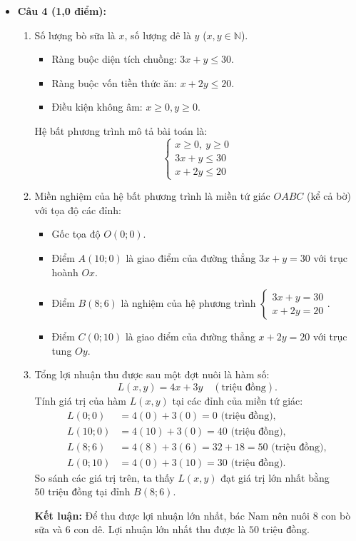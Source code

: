 \documentclass[12pt,a4paper]{article}
\begin{document}
\begin{itemize}[leftmargin=0.6cm, itemsep=4pt]
\item \textbf{Câu 4 (1,0 điểm):}
\begin{enumerate}
    \item Số lượng bò sữa là $x$, số lượng dê là $y$ ($x, y \in \mathbb{N}$).
    \begin{itemize}
        \item Ràng buộc diện tích chuồng: $3x + y \leq 30$.
        \item Ràng buộc vốn tiền thức ăn: $x + 2y \leq 20$.
        \item Điều kiện không âm: $x \geq 0, y \geq 0$.
    \end{itemize}
    Hệ bất phương trình mô tả bài toán là:
    \[
    \begin{cases}
    x \geq 0,\ y \geq 0 \\
    3x + y \leq 30 \\
    x + 2y \leq 20
    \end{cases}
    \]
    \item Miền nghiệm của hệ bất phương trình là miền tứ giác $OABC$ (kể cả bờ) với tọa độ các đỉnh:
    \begin{itemize}
        \item Gốc tọa độ $O(0; 0)$.
        \item Điểm $A(10; 0)$ là giao điểm của đường thẳng $3x + y = 30$ với trục hoành $Ox$.
        \item Điểm $B(8; 6)$ là nghiệm của hệ phương trình $\begin{cases} 3x + y = 30 \\ x + 2y = 20 \end{cases}$.
        \item Điểm $C(0; 10)$ là giao điểm của đường thẳng $x + 2y = 20$ với trục tung $Oy$.
    \end{itemize}
    \item Tổng lợi nhuận thu được sau một đợt nuôi là hàm số:
    \[
    L(x, y) = 4x + 3y\quad (\text{triệu đồng}).
    \]
    Tính giá trị của hàm $L(x, y)$ tại các đỉnh của miền tứ giác:
    \begin{align*}
    L(0; 0) &= 4(0) + 3(0) = 0\text{ (triệu đồng)},\\
    L(10; 0) &= 4(10) + 3(0) = 40\text{ (triệu đồng)},\\
    L(8; 6) &= 4(8) + 3(6) = 32 + 18 = 50\text{ (triệu đồng)},\\
    L(0; 10) &= 4(0) + 3(10) = 30\text{ (triệu đồng)}.
    \end{align*}
    So sánh các giá trị trên, ta thấy $L(x, y)$ đạt giá trị lớn nhất bằng $50\text{ triệu đồng}$ tại đỉnh $B(8; 6)$.
    \par
    \textbf{Kết luận:} Để thu được lợi nhuận lớn nhất, bác Nam nên nuôi $8$ con bò sữa và $6$ con dê. Lợi nhuận lớn nhất thu được là $50\text{ triệu đồng}$.
\end{enumerate}
\end{itemize}
\end{document}
